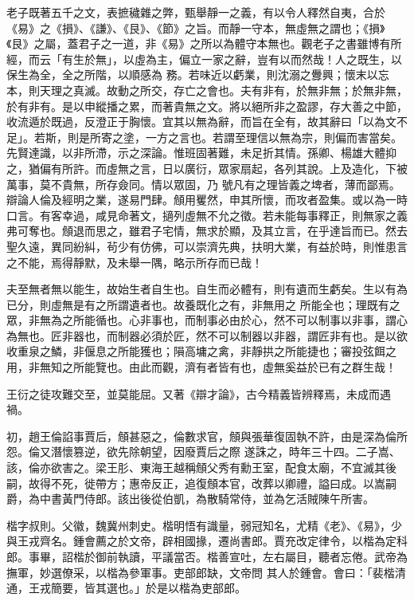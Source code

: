 \begin{pinyinscope}
 老子既著五千之文，表摭穢雜之弊，甄舉靜一之義，有以令人釋然自夷，合於《易》之《損》、《謙》、《艮》、《節》之旨。而靜一守本，無虛無之謂也；《損》《艮》之屬，蓋君子之一道，非《易》之所以為體守本無也。觀老子之書雖博有所經，而云「有生於無」，以虛為主，偏立一家之辭，豈有以而然哉！人之既生，以保生為全，全之所階，以順感為
 務。若味近以虧業，則沈溺之釁興；懷末以忘本，則天理之真滅。故動之所交，存亡之會也。夫有非有，於無非無；於無非無，於有非有。是以申縱播之累，而著貴無之文。將以絕所非之盈謬，存大善之中節，收流遁於既過，反澄正于胸懷。宜其以無為辭，而旨在全有，故其辭曰「以為文不足」。若斯，則是所寄之塗，一方之言也。若謂至理信以無為宗，則偏而害當矣。先賢達識，以非所滯，示之深論。惟班固著難，未足折其情。孫卿、楊雄大體抑之，猶偏有所許。而虛無之言，日以廣衍，眾家扇起，各列其說。上及造化，下被萬事，莫不貴無，所存僉同。情以眾固，乃
 號凡有之理皆義之埤者，薄而鄙焉。辯論人倫及經明之業，遂易門肆。頠用矍然，申其所懷，而攻者盈集。或以為一時口言。有客幸過，咸見命著文，擿列虛無不允之徵。若未能每事釋正，則無家之義弗可奪也。頠退而思之，雖君子宅情，無求於顯，及其立言，在乎達旨而已。然去聖久遠，異同紛糾，茍少有仿佛，可以崇濟先典，扶明大業，有益於時，則惟患言之不能，焉得靜默，及未舉一隅，略示所存而已哉！



 夫至無者無以能生，故始生者自生也。自生而必體有，則有遺而生虧矣。生以有為已分，則虛無是有之所謂遺者也。故養既化之有，非無用之
 所能全也；理既有之眾，非無為之所能循也。心非事也，而制事必由於心，然不可以制事以非事，謂心為無也。匠非器也，而制器必須於匠，然不可以制器以非器，謂匠非有也。是以欲收重泉之鱗，非偃息之所能獲也；隕高墉之禽，非靜拱之所能捷也；審投弦餌之用，非無知之所能覽也。由此而觀，濟有者皆有也，虛無奚益於已有之群生哉！



 王衍之徒攻難交至，並莫能屈。又著《辯才論》，古今精義皆辨釋焉，未成而遇禍。



 初，趙王倫諂事賈后，頠甚惡之，倫數求官，頠與張華復固執不許，由是深為倫所怨。倫又潛懷篡逆，欲先除朝望，因廢賈后之際
 遂誅之，時年三十四。二子嵩、該，倫亦欲害之。梁王肜、東海王越稱頠父秀有勳王室，配食太廟，不宜滅其後嗣，故得不死，徙帶方；惠帝反正，追復頠本官，改葬以卿禮，謚曰成。以嵩嗣爵，為中書黃門侍郎。該出後從伯凱，為散騎常侍，並為乞活賊陳午所害。



 楷字叔則。父徽，魏冀州刺史。楷明悟有識量，弱冠知名，尤精《老》、《易》，少與王戎齊名。鍾會薦之於文帝，辟相國掾，遷尚書郎。賈充改定律令，以楷為定科郎。事畢，詔楷於御前執讀，平議當否。楷善宣吐，左右屬目，聽者忘倦。武帝為撫軍，妙選僚采，以楷為參軍事。吏部郎缺，文帝問
 其人於鍾會。會曰：「裴楷清通，王戎簡要，皆其選也。」於是以楷為吏部郎。




\end{pinyinscope}

